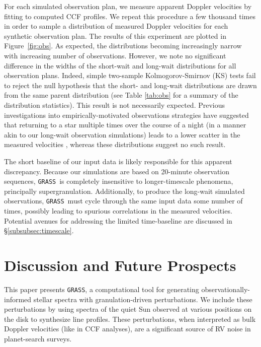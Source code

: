 \documentclass[twocolumn]{aastex63}
\newcommand{\grass}{\texttt{GRASS}}
\newcommand{\revise}[1]{#1}
\newcommand{\revisetwo}[1]{#1}
\begin{document}
For each simulated observation plan, we measure apparent Doppler velocities by fitting to computed CCF profiles. We repeat this procedure \revisetwo{a few thousand times} in order to sample a distribution of measured Doppler velocities for each synthetic observation plan. The results of this experiment are plotted in Figure~\ref{fig:obs}. As expected, the distributions becoming increasingly narrow with increasing number of observations. \revisetwo{However, we note no significant difference in the widths of the short-wait and long-wait distributions for all observation plans. Indeed, simple two-sample Kolmogorov-Smirnov (KS) tests fail to reject the null hypothesis that the short- and long-wait distributions are drawn from the same parent distribution (see Table \ref{tab:obs} for a summary of the distribution statistics).} This result is not necessarily expected. Previous investigations into empirically-motivated observations strategies have suggested that returning to a star multiple times over the course of a night \revisetwo{(in a manner akin to our long-wait observation simulations)} leads \revisetwo{to a lower scatter in the measured velocities} \citep[e.g.,][]{Dumusque2011, Meunier2015, CollierCameron2019}\revisetwo{, whereas these distributions suggest no such result.} \par 

\revise{The short baseline of our input data is likely responsible for this apparent discrepancy. Because our simulations are based on 20-minute observation sequences, \grass\ is completely insensitive to longer-timescale phenomena, principally supergranulation. Additionally, to produce the long-wait simulated observations, \grass\ must cycle through the same input data some number of times, possibly leading to spurious correlations in the measured velocities.} Potential avenues for addressing the limited time-baseline are discussed in \S\ref{subsubsec:timescale}. \par 


\section{Discussion and Future Prospects} \label{discussion}
This paper presents \grass, a computational tool for generating observationally-informed stellar spectra with granulation-driven perturbations. We include these perturbations by using spectra of the quiet Sun observed at various positions on the disk to synthesize line profiles. These perturbations, when interpreted as bulk Doppler velocities (like in CCF analyses), are a significant source of RV noise in planet-search surveys. \par
\end{document}
